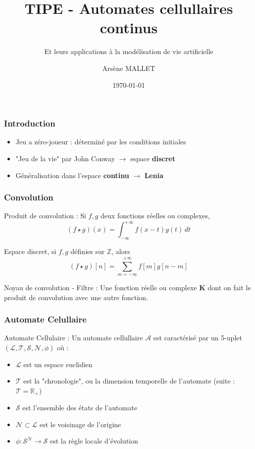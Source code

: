 \documentclass[aspectratio=43]{beamer}
\title[Automates Cellulaires]{TIPE - Automates cellullaires continus}
\subtitle{Et leurs applications \`a la mod\'elisation de vie artificielle}
\author{Ars\`ene MALLET}
\date[\today]{\today}
\institute{Candidat - 22669}
\begin{document}
\begin{frame}
	\titlepage
\end{frame}

\begin{frame}
	\frametitle{Introduction}

	\begin{itemize}
		\setlength\itemsep{2em}
		\item Jeu a z\'ero-joueur : d\'etermin\'e par les
			conditions initiales
		\item "Jeu de la vie" par John Conway $\rightarrow$ espace \textbf{discret}
		\item G\'en\'eralisation dans l'espace \textbf{continu} $\rightarrow$ \textbf{Lenia}
	\end{itemize}
\end{frame}

\begin{frame}
	\frametitle{Convolution}

	\begin{block}{Produit de convolution :}
		Si $f, g$ deux fonctions réelles ou complexes, $$ (f \star g)(x) = \int_{-\infty}^{+\infty} f(x-t)g(t)\,dt$$

		Espace discret, si $f, g$ définies sur $\mathbb{Z}$, alors
		$$ (f \star g)[n] = \sum_{m = -\infty}^{+\infty} f[m]g[n - m]$$
	\end{block}

	\begin{block}{Noyau de convolution - Filtre :}
		Une fonction réelle ou complexe $\mathbf{K}$ dont on fait le produit de convolution
		avec une autre fonction.
	\end{block}
\end{frame}

\begin{frame}
	\frametitle{Automate Celullaire}

	\begin{block}{Automate Cellulaire :}
		Un automate cellullaire $\mathcal{A}$ est caract\'eris\'e par un 5-uplet
		$(\mathcal{L}, \mathcal{T}, \mathcal{S}, \mathcal{N}, \phi)$ où :
		\begin{itemize}
			\item $\mathcal{L}$ est un espace euclidien
			\item $\mathcal{T}$ est la "chronologie", ou la dimension temporelle de l'automate (suite : $\mathcal{T} = \mathbb{R}_+$)
			\item $\mathcal{S}$ est l'ensemble des états de l'automate
			\item $\mathcal{N} \subset \mathcal{L}$ est le voisinage de l'origine
			\item $\phi : \mathcal{S}^{\mathcal{N}} \rightarrow \mathcal{S}$ est la règle locale d'évolution
		\end{itemize}
	\end{block}


\end{frame}
\end{document}
